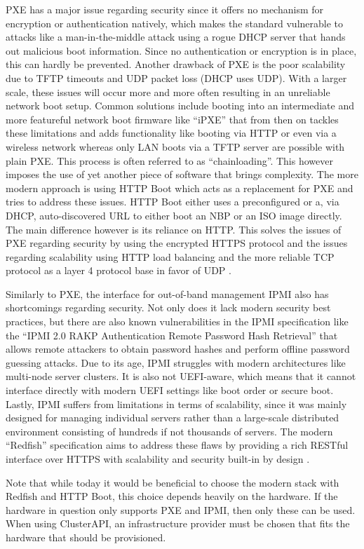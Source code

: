     PXE has a major issue regarding security since it offers no mechanism for encryption or authentication natively, which makes the standard vulnerable to attacks like a man-in-the-middle attack using a rogue DHCP server that hands out malicious boot information. Since no authentication or encryption is in place, this can hardly be prevented. Another drawback of PXE is the poor scalability due to TFTP timeouts and UDP packet loss (DHCP uses UDP). With a larger scale, these issues will occur more and more often resulting in an unreliable network boot setup. Common solutions include booting into an intermediate and more featureful network boot firmware like ``iPXE'' that from then on tackles these limitations and adds functionality like booting via HTTP or even via a wireless network whereas only LAN boots via a TFTP server are possible with plain PXE. This process is often referred to as ``chainloading''. This however imposes the use of yet another piece of software that brings complexity. The more modern approach is using HTTP Boot which acts as a replacement for PXE and tries to address these issues. HTTP Boot either uses a preconfigured or a, via DHCP, auto-discovered URL to either boot an NBP or an ISO image directly. The main difference however is its reliance on HTTP. This solves the issues of PXE regarding security by using the encrypted HTTPS protocol and the issues regarding scalability using HTTP load balancing and the more reliable TCP protocol as a layer 4 protocol base in favor of UDP \cite{pxe_ipmi_redfish_httpboot}. \newline

    Similarly to PXE, the interface for out-of-band management IPMI also has shortcomings regarding security. Not only does it lack modern security best practices, but there are also known vulnerabilities in the IPMI specification like the ``IPMI 2.0 RAKP Authentication Remote Password Hash Retrieval'' that allows remote attackers to obtain password hashes and perform offline password guessing attacks. Due to its age, IPMI struggles with modern architectures like multi-node server clusters. It is also not UEFI-aware, which means that it cannot interface directly with modern UEFI settings like boot order or secure boot. Lastly, IPMI suffers from limitations in terms of scalability, since it was mainly designed for managing individual servers rather than a large-scale distributed environment consisting of hundreds if not thousands of servers. The modern ``Redfish'' specification aims to address these flaws by providing a rich RESTful interface over HTTPS with scalability and security built-in by design \cite{pxe_ipmi_redfish_httpboot}.\newline

    Note that while today it would be beneficial to choose the modern stack with Redfish and HTTP Boot, this choice depends heavily on the hardware. If the hardware in question only supports PXE and IPMI, then only these can be used. When using ClusterAPI, an infrastructure provider must be chosen that fits the hardware that should be provisioned.